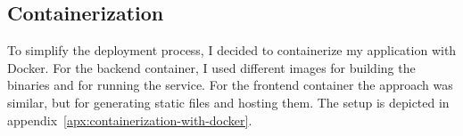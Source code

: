 \subsection{Containerization}\label{sec:containerization}


To simplify the deployment process,
I decided to containerize my application
with Docker.
For the backend container,
I used different images
for building the binaries
and for running the service.
For the frontend container the approach was similar,
but for generating static files
and hosting them.
The setup is depicted in appendix~\ref{apx:containerization-with-docker}.
